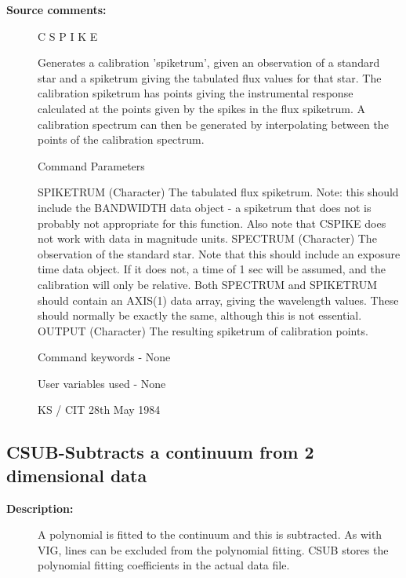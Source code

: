 \begin{description}
\begin{description}
\item [\textbf{Source comments:}]
\begin{terminalv}
 C S P I K E

 Generates a calibration 'spiketrum', given an observation of
 a standard star and a spiketrum giving the tabulated flux
 values for that star.  The calibration spiketrum has points
 giving the instrumental response calculated at the points
 given by the spikes in the flux spiketrum.  A calibration
 spectrum can then be generated by interpolating between the
 points of the calibration spectrum.

 Command Parameters

 SPIKETRUM     (Character) The tabulated flux spiketrum.  Note:
               this should include the BANDWIDTH data
               object - a spiketrum that does not is probably
               not appropriate for this function.  Also note that
               CSPIKE does not work with data in magnitude units.
 SPECTRUM      (Character) The observation of the standard star.
               Note that this should include an exposure time data
               object.  If it does not, a time of 1 sec will be
               assumed, and the calibration will only be relative.
               Both SPECTRUM and SPIKETRUM should contain an
               AXIS(1) data array, giving the wavelength values.  These
               should normally be exactly the same, although this
               is not essential.
 OUTPUT        (Character) The resulting spiketrum of calibration
               points.

 Command keywords - None

 User variables used - None

                                  KS / CIT 28th May 1984
\end{terminalv}
\end{description}
\subsection{CSUB-\label{CSUB}Subtracts a continuum from 2 dimensional data}
\begin{description}

\item [\textbf{Description:}]
  A polynomial is
  fitted to the continuum and this is subtracted.
  As with VIG, lines can be excluded from the polynomial
  fitting. CSUB stores the polynomial fitting coefficients in
  the actual data file.


\end{description}
\end{description}
